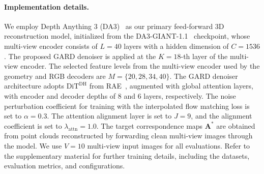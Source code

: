 \documentclass{llmxive}
\begin{document}
\paragraph{Implementation details.}
We employ Depth Anything 3 (DA3)~\cite{depthanything3} as our primary feed-forward 3D reconstruction model, initialized from the DA3-GIANT-1.1~\cite{depthanything3} checkpoint, whose multi-view encoder consists of $L=40$ layers with a hidden dimension of $C=1536$. The proposed GARD denoiser is applied at the $K=18$-th layer of the multi-view encoder. The selected feature levels from the multi-view encoder used by the geometry and RGB decoders are $M=\{20, 28, 34, 40\}$. The GARD denoiser architecture adopts $\text{DiT}^{\text{DH}}$ from RAE~\cite{zheng2025diffusion}, augmented with global attention layers, with encoder and decoder depths of 8 and 6 layers, respectively. The noise perturbation coefficient for training with the interpolated flow matching loss is set to $\alpha=0.3$. The attention alignment layer is set to $J=9$, and the alignment coefficient is set to $\lambda_\text{attn}=1.0$. The target correspondence maps $\mathbf{A}^{*}$ are obtained from point clouds reconstructed by forwarding clean multi-view images through the model. We use $V=10$ multi-view input images for all evaluations. Refer to the supplementary material for further training details, including the datasets, evaluation metrics, and configurations.


\end{document}
